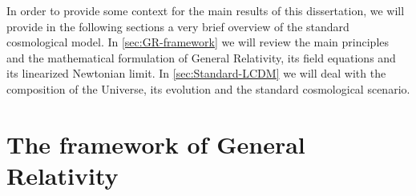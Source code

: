 In order to provide some context for the main results of this dissertation, we will
provide in the following sections a very brief overview of the standard cosmological model. 
In \cref{sec:GR-framework} we will review the main principles and the mathematical 
formulation of General Relativity, its field equations and
its linearized Newtonian limit.
In \cref{sec:Standard-LCDM} we will deal with the composition of the Universe,
its evolution and the standard cosmological scenario.


\section{The framework of General Relativity \label{sec:GR-framework}}



